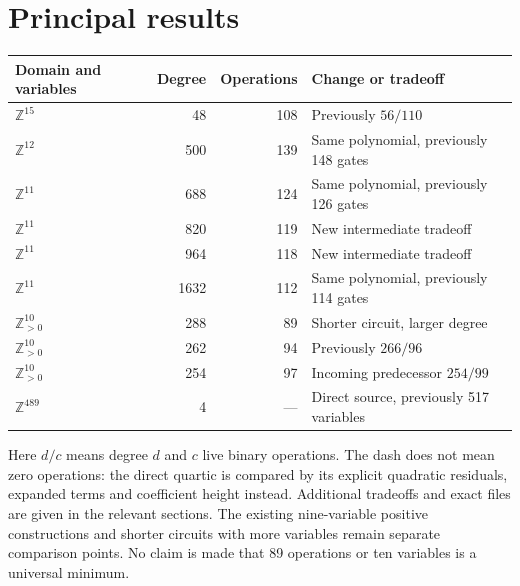 \begin{abstract}
This iteration combines recent ProveIt constructions with a later-stage application of
paired sign conditions. If two integers have a known nonnegative sum,
one nonnegativity certificate for their product enforces both signs.
Applied after a carefully ordered power-recovery argument, this gives a
direct quartic in 489 unrestricted integers, compared with the incoming
517-variable predecessor. The variable saving is accompanied by larger
coefficient height, not an improvement in every size measure.

A second centering gives a simpler compact endpoint: fifteen unrestricted
integers, exact degree 48 and 108 arithmetic operations, compared with
degree 56 and 110 operations. Coprime grouping supplies new eleven-integer
tradeoffs, while auxiliary Pell growth removes a transport majorant from
ten-positive-variable equations. The smallest operation count in that
ten-variable family is 89 at degree 288; a degree-254 alternative uses
97 operations. All conclusions concern ordinary mathematical reductions
with explicit inherited logical calibration, not new end-to-end kernel
certificates or a global optimum.
\end{abstract}

\section*{Principal results}
\begin{center}
\begin{tabular}{@{}lrrl@{}}
\toprule
Domain and variables & Degree & Operations & Change or tradeoff\\
\midrule
$\mathbb Z^{15}$ &48&108&Previously $56/110$\\
$\mathbb Z^{12}$ &500&139&Same polynomial, previously 148 gates\\
$\mathbb Z^{11}$ &688&124&Same polynomial, previously 126 gates\\
$\mathbb Z^{11}$ &820&119&New intermediate tradeoff\\
$\mathbb Z^{11}$ &964&118&New intermediate tradeoff\\
$\mathbb Z^{11}$ &1632&112&Same polynomial, previously 114 gates\\
$\mathbb Z_{>0}^{10}$ &288&89&Shorter circuit, larger degree\\
$\mathbb Z_{>0}^{10}$ &262&94&Previously $266/96$\\
$\mathbb Z_{>0}^{10}$ &254&97&Incoming predecessor $254/99$\\
$\mathbb Z^{489}$ &4&---&Direct source, previously 517 variables\\
\bottomrule
\end{tabular}
\end{center}
Here $d/c$ means degree $d$ and $c$ live binary operations. The dash does
not mean zero operations: the direct quartic is compared by its explicit
quadratic residuals, expanded terms and coefficient height instead.
Additional tradeoffs and exact files are given in the relevant sections.
The existing nine-variable positive constructions and shorter circuits
with more variables remain separate comparison points. No claim is made
that 89 operations or ten variables is a universal minimum.

